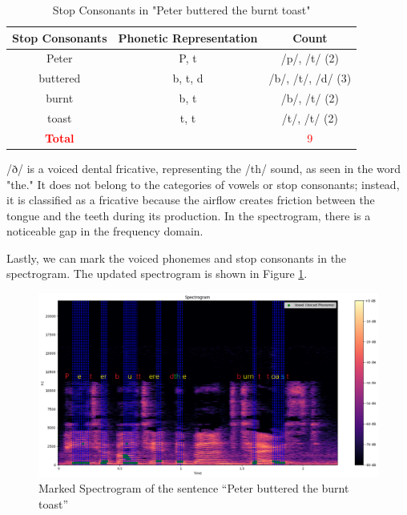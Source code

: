 \vspace{1em} %
\begin{table}[H]
    \centering
    \begin{tabular}{|c|c|c|}
        \hline
        \textbf{Stop Consonants} & \textbf{Phonetic Representation} & \textbf{Count} \\ \hline
        Peter  & P, t & /p/, /t/ (2) \\ \hline
        buttered & b, t, d & /b/, /t/, /d/ (3) \\ \hline
        burnt & b, t & /b/, /t/ (2) \\ \hline
        toast & t, t & /t/, /t/ (2) \\ \hline
        \textcolor{red}{\textbf{Total}} & & \textcolor{red}{9} \\ \hline
    \end{tabular}
    \caption{Stop Consonants in "Peter buttered the burnt toast"}
\end{table}


/ð/ is a voiced dental fricative, representing the /th/ sound, as seen in the word "the." It does not belong to the categories of vowels or stop consonants; instead, it is classified as a fricative because the airflow creates friction between the tongue and the teeth during its production. In the spectrogram, there is a noticeable gap in the frequency domain.

Lastly, we can mark the voiced phonemes and stop consonants in the spectrogram. The updated spectrogram is shown in Figure \ref{fig:Question1-3}.

\begin{figure}[H]
    \centering
    \includegraphics[width=\textwidth]{./img/Q1-2.png}
    \caption{Marked Spectrogram of the sentence “Peter buttered the burnt toast”}
    \label{fig:Question1-3}
\end{figure}

